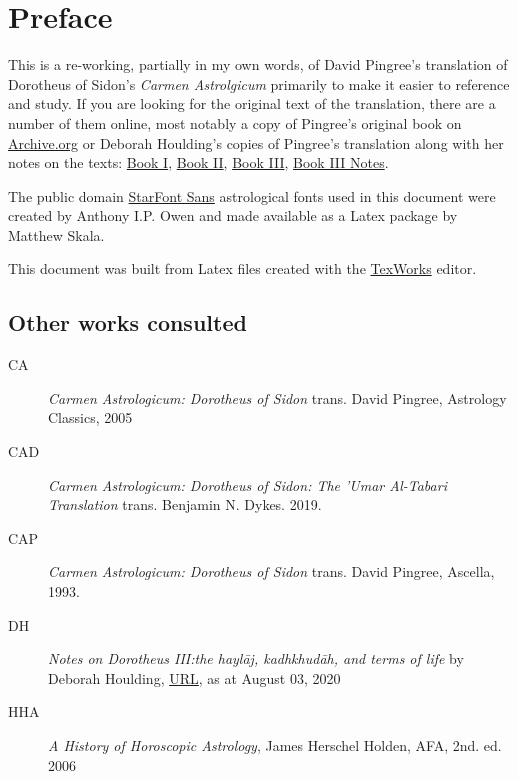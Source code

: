 \chapter{Preface}
This is a re-working, partially in my own words, of David Pingree's translation of Dorotheus of Sidon's \textsl{Carmen Astrolgicum} primarily to make it easier to reference and study. If you are looking for the original text of the translation, there are a number of them online, most notably a copy of Pingree's original book on \href{https://archive.org/details/PingreeDS1976}{Archive.org} or Deborah Houlding's copies of Pingree's translation along with her notes on the texts: \href{https://www.skyscript.co.uk/dorotheus1.pdf}{Book I}, \href{https://www.skyscript.co.uk/dorotheus2.pdf}{Book II}, \href{https://www.skyscript.co.uk/dorotheus3.pdf}{Book III}, \href{https://www.skyscript.co.uk/dorotheus3notes.pdf}{Book III Notes}.

The public domain \href{https://www.ctan.org/pkg/starfont}{StarFont Sans} astrological fonts used in this document were created by Anthony I.P. Owen and made available as a Latex package by Matthew Skala. 

This document was built from Latex files created with the \href{https://www.tug.org/texworks/}{TexWorks} editor.

\section{Other works consulted}
\begin{description}
\item[CA]
	\textsl{Carmen Astrologicum: Dorotheus of Sidon} trans. David Pingree, Astrology Classics, 2005

\item[CAD]
	\textsl{Carmen Astrologicum: Dorotheus of Sidon: The 'Umar Al-Tabari Translation} trans. Benjamin N. Dykes. 2019.

\item[CAP]
	\textsl{Carmen Astrologicum: Dorotheus of Sidon} trans. David Pingree, Ascella, 1993.
	
\item[DH]
	\textsl{Notes on Dorotheus III:the haylāj, kadhkhudāh, and terms of life} by Deborah Houlding, \href{https://www.skyscript.co.uk/dorotheus3notes.pdf}{URL}, as at August 03, 2020
	
\item[HHA]
	\textsl{A History of Horoscopic Astrology}, James Herschel Holden, AFA, 2nd. ed. 2006
\end{description}

